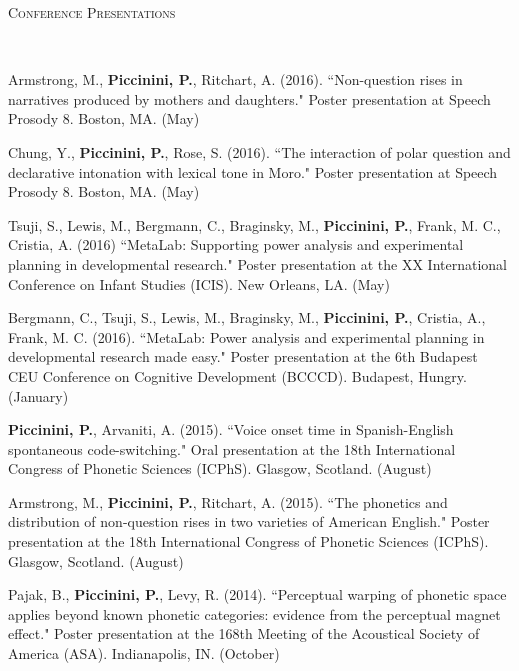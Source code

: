 \documentclass[9pt]{article}
\newenvironment{changemargin}[2]{%
  \begin{list}{}{%
    \setlength{\topsep}{0pt}%
    \setlength{\leftmargin}{#1}%
    \setlength{\rightmargin}{#2}%
    \setlength{\listparindent}{\parindent}%
    \setlength{\itemindent}{\parindent}%
    \setlength{\parsep}{\parskip}%
  }%
  \item[]}{\end{list}
}
\newcommand{\lineover}{
	\begin{changemargin}{-0.05in}{-0.05in}
		\vspace*{-8pt}
		\hrulefill \\
		\vspace*{-2pt}
	\end{changemargin}
}
\newcommand{\header}[1]{
	\begin{changemargin}{-0.5in}{-0.5in}
		\scshape{#1}\\
  	\lineover
	\end{changemargin}
}
\newenvironment{body} {
	\vspace*{-16pt}
	\begin{changemargin}{-0.25in}{-0.5in}
  }	
	{\end{changemargin}
}
\begin{document}
\smallskip



\header{Conference Presentations}

\begin{body}
	\vspace{14pt}
	
	Armstrong, M., \textbf{Piccinini, P.}, Ritchart, A. (2016). ``Non-question rises in narratives produced by mothers and daughters." Poster presentation at Speech Prosody 8. Boston, MA. (May)\\
	\medskip
	
	Chung, Y., \textbf{Piccinini, P.}, Rose, S. (2016). ``The interaction of polar question and declarative intonation with lexical tone in Moro." Poster presentation at Speech Prosody 8. Boston, MA. (May)\\
	\medskip
	
	Tsuji, S.,  Lewis, M., Bergmann, C., Braginsky, M., \textbf{Piccinini, P.}, Frank, M. C., Cristia, A. (2016) ``MetaLab: Supporting power analysis and experimental planning in developmental research." Poster presentation at the XX International Conference on Infant Studies (ICIS). New Orleans, LA. (May)\\
	\medskip
	
	Bergmann, C., Tsuji, S., Lewis, M., Braginsky, M., \textbf{Piccinini, P.}, Cristia, A., Frank, M. C. (2016). ``MetaLab: Power analysis and experimental planning in developmental research made easy." Poster presentation at the 6th Budapest CEU Conference on Cognitive Development (BCCCD). Budapest, Hungry. (January)\\
	\medskip
	
	\textbf{Piccinini, P.}, Arvaniti, A. (2015). ``Voice onset time in Spanish-English spontaneous code-switching." Oral presentation at the 18th International Congress of Phonetic Sciences (ICPhS). Glasgow, Scotland. (August)\\
	\medskip
	
	Armstrong, M., \textbf{Piccinini, P.}, Ritchart, A. (2015). ``The phonetics and distribution of non-question rises in two varieties of American English." Poster presentation at the 18th International Congress of Phonetic Sciences (ICPhS). Glasgow, Scotland. (August)\\
	\medskip

	Pajak, B., \textbf{Piccinini, P.}, Levy, R. (2014). ``Perceptual warping of phonetic space applies beyond known phonetic categories: evidence from the perceptual magnet effect." Poster presentation at the 168th Meeting of the Acoustical Society of America (ASA). Indianapolis, IN. (October)\\
	\medskip


\end{body}
\end{document}
